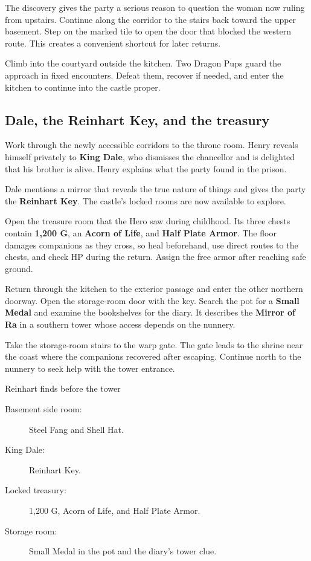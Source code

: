 The discovery gives the party a serious reason to question the woman
now ruling from upstairs. Continue along the corridor to the stairs
back toward the upper basement. Step on the marked tile to open the
door that blocked the western route. This creates a convenient shortcut
for later returns.

Climb into the courtyard outside the kitchen. Two Dragon Pups guard
the approach in fixed encounters. Defeat them, recover if needed, and
enter the kitchen to continue into the castle proper.

\subsection*{Dale, the Reinhart Key, and the treasury}

Work through the newly accessible corridors to the throne room.
Henry reveals himself privately to \textbf{King Dale}, who dismisses
the chancellor and is delighted that his brother is alive. Henry explains
what the party found in the prison.

Dale mentions a mirror that reveals the true nature of things and
gives the party the \textbf{Reinhart Key}. The castle's locked rooms
are now available to explore.


Open the treasure room that the Hero saw during childhood. Its three
chests contain \textbf{1,200 G}, an \textbf{Acorn of Life}, and
\textbf{Half Plate Armor}. The floor damages companions as they cross,
so heal beforehand, use direct routes to the chests, and check HP during
the return. Assign the free armor after reaching safe ground.

Return through the kitchen to the exterior passage and enter the other
northern doorway. Open the storage-room door with the key. Search the
pot for a \textbf{Small Medal} and examine the bookshelves for the diary.
It describes the \textbf{Mirror of Ra} in a southern tower whose access
depends on the nunnery.

Take the storage-room stairs to the warp gate. The gate leads to the
shrine near the coast where the companions recovered after escaping.
Continue north to the nunnery to seek help with the tower entrance.

\begin{routecheck}{Reinhart finds before the tower}
\begin{description}
  \item[Basement side room:] Steel Fang and Shell Hat.
  \item[King Dale:] Reinhart Key.
  \item[Locked treasury:] 1,200 G, Acorn of Life, and Half Plate Armor.
  \item[Storage room:] Small Medal in the pot and the diary's tower clue.
\end{description}
\end{routecheck}

